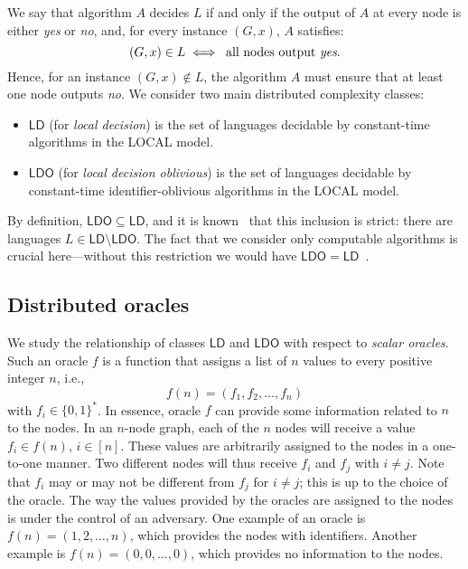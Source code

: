 \documentclass[11pt,a4paper]{article}
\theoremstyle{definition}
\theoremstyle{remark}
\newcommand{\ldo}{\mathsf{LDO}}
\newcommand{\ld}{\mathsf{LD}}
\begin{document}
We say that algorithm $A$ decides $L$ if and only if the output of $A$ at every node is either  \emph{yes} or  \emph{no}, and, for every instance $(G,x)$, $A$ satisfies:  
\[(G,x) \in L  \iff \; \mbox{all nodes output \emph{yes}.}
\]
Hence, for an instance $(G,x)\notin L$, the algorithm $A$ must ensure that at least one node outputs \emph{no}. We consider two main distributed complexity classes: 
\begin{itemize}
\item $\ld$ (for \emph{local decision}) is the set of languages decidable by constant-time algorithms in the \textsf{LOCAL} model. 
\item $\ldo$  (for \emph{local decision oblivious}) is the set of languages decidable by constant-time identifier-oblivious algorithms in the \textsf{LOCAL} model.
\end{itemize}
By definition, $\ldo\subseteq \ld$, and it is known~\cite{fraigniaud13ld-id} that this inclusion is strict: there are languages $L\in\ld\setminus\ldo$. The fact that we consider only computable algorithms is crucial here---without this restriction we would have $\ldo = \ld$~\cite{fraigniaud13ld-id}.

\subsection{Distributed oracles}\label{ssec:def-oracle}

We study the relationship of classes $\ld$ and $\ldo$ with respect to \emph{scalar oracles}. Such an oracle $f$ is a function that assigns a list of $n$ values to every positive integer $n$, i.e., 
\[
f(n) = (f_1, f_2, \dots, f_n)
\] 
with $f_i\in\{0,1\}^*$. In essence, oracle $f$ can provide some information related to $n$ to the nodes. In an $n$-node graph, each of the $n$ nodes will receive a value $f_i\in f(n)$, $i\in[n]$. These values are arbitrarily assigned to the nodes in a one-to-one manner. Two different nodes will thus receive $f_i$ and $f_j$ with $i\neq j$. Note that $f_i$ may or may not be different from $f_j$ for $i\neq j$; this is up to the choice of the oracle. The way the values provided by the oracles are assigned to the nodes is under the control of an adversary.  One example of an oracle is $f(n)=(1,2,\dots,n)$, which provides the nodes with identifiers. Another example is $f(n)=(0,0,\dots,0)$, which provides no information to the nodes. 
\end{document}
